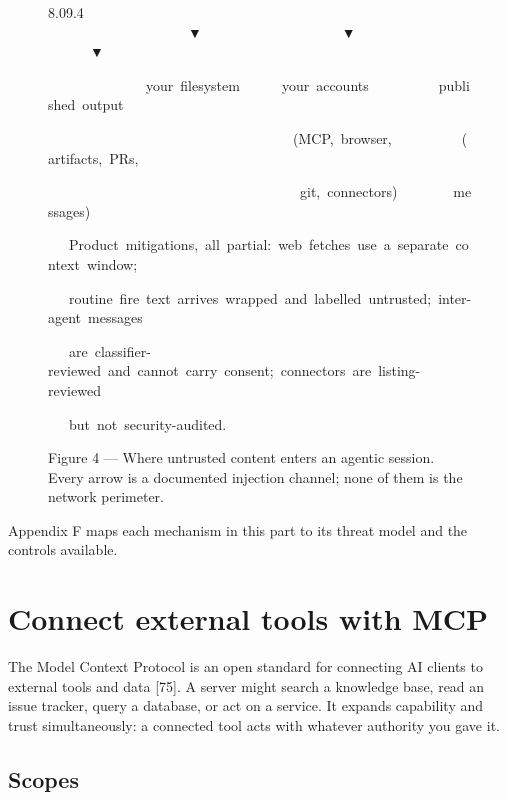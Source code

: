 \documentclass[11pt,a4paper,twoside,openany]{book}
\newcommand{\chaptertitlelabel}{}
\newcommand{\cl}[1]{\noindent\mbox{#1}\par}
\newcommand{\figcaption}[1]{\par\addvspace{2.6mm}%
  {\sffamily\footnotesize\color{deepindigo}\RaggedRight #1\par}}
\begin{document}
\begin{figure}[tbp]
\begin{codefig}{8.0}{9.4}
\cl{~~~~~~~~~~~~~~~~~~~~▼~~~~~~~~~~~~~~~~~~~~▼~~~~~~~~~~~~~~~~~~~~~~▼}
\cl{~~~~~~~~~~~~~~your~filesystem~~~~~~your~accounts~~~~~~~~~~published~output}
\cl{~~~~~~~~~~~~~~~~~~~~~~~~~~~~~~~~~~~(MCP,~browser,~~~~~~~~~~(artifacts,~PRs,}
\cl{~~~~~~~~~~~~~~~~~~~~~~~~~~~~~~~~~~~~git,~connectors)~~~~~~~~messages)}
\cl{}
\cl{~~~Product~mitigations,~all~partial:~web~fetches~use~a~separate~context~window;}
\cl{~~~routine~fire~text~arrives~wrapped~and~labelled~untrusted;~inter-agent~messages}
\cl{~~~are~classifier-reviewed~and~cannot~carry~consent;~connectors~are~listing-reviewed}
\cl{~~~but~not~security-audited.}
\end{codefig}
\figcaption{Figure 4 — Where untrusted content enters an agentic session. Every arrow is a documented injection channel; none of them is the network perimeter.}
\end{figure}


Appendix F maps each mechanism in this part to its threat model and the controls available.


\FloatBarrier
\renewcommand{\chaptertitlelabel}{Part IV \textperiodcentered\ Chapter 13}
\setcounter{chapter}{12}
\chapter{Connect external tools with MCP}

The Model Context Protocol is an open standard for connecting AI clients to external tools and data [75]. A server might search a knowledge base, read an issue tracker, query a database, or act on a service. It expands capability and trust simultaneously: a connected tool acts with whatever authority you gave it.


\FloatBarrier
\setcounter{section}{0}
\section{Scopes}
\end{document}
